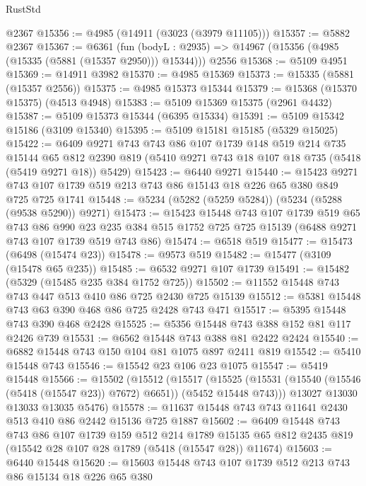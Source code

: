 \begin{lexlean}{RustStd}
\begin{coremodule}
    @2367
@15356 := @4985 (@14911 (@3023 (@3979 @11105)))
@15357 := @5882 @2367
@15367 := @6361
    (fun (bodyL : @2935) => @14967 (@15356 (@4985 (@15335 (@5881 (@15357 @2950))) @15344)))
    @2556
@15368 := @5109 @4951
@15369 := @14911 @3982
@15370 := @4985 @15369
@15373 := @15335 (@5881 (@15357 @2556))
@15375 := @4985 @15373 @15344
@15379 := @15368 (@15370 @15375) (@4513 @4948)
@15383 := @5109 @15369 @15375 (@2961 @4432)
@15387 := @5109 @15373 @15344 (@6395 @15334)
@15391 := @5109 @15342 @15186 (@3109 @15340)
@15395 := @5109 @15181 @15185 (@5329 @15025)
@15422 := @6409
    @9271
    @743
    @743
    @86
    @107
    @1739
    @148
    @519
    @214
    @735
    @15144
    @65
    @812
    @2390
    @819
    (@5410 @9271 @743 @18 @107 @18 @735 (@5418 (@5419 @9271 @18)) @5429)
@15423 := @6440 @9271
@15440 := @15423
    @9271
    @743
    @107
    @1739
    @519
    @213
    @743
    @86
    @15143
    @18
    @226
    @65
    @380
    @849
    @725
    @725
    @1741
@15448 := @5234 (@5282 (@5259 @5284)) (@5234 (@5288 (@9538 @5290)) @9271)
@15473 := @15423
    @15448
    @743
    @107
    @1739
    @519
    @65
    @743
    @86
    @990
    @23
    @235
    @384
    @515
    @1752
    @725
    @725
    @15139
    (@6488 @9271 @743 @107 @1739 @519 @743 @86)
@15474 := @6518 @519
@15477 := @15473 (@6498 (@15474 @23))
@15478 := @9573 @519
@15482 := @15477 (@3109 (@15478 @65 @235))
@15485 := @6532 @9271 @107 @1739
@15491 := @15482 (@5329 (@15485 @235 @384 @1752 @725))
@15502 := @11552 @15448 @743 @743 @447 @513 @410 @86 @725 @2430 @725 @15139
@15512 := @5381 @15448 @743 @63 @390 @468 @86 @725 @2428 @743 @471
@15517 := @5395 @15448 @743 @390 @468 @2428
@15525 := @5356 @15448 @743 @388 @152 @81 @117 @2426 @739
@15531 := @6562 @15448 @743 @388 @81 @2422 @2424
@15540 := @6882 @15448 @743 @150 @104 @81 @1075 @897 @2411 @819
@15542 := @5410 @15448 @743
@15546 := @15542 @23 @106 @23 @1075
@15547 := @5419 @15448
@15566 := @15502
    (@15512
      (@15517
        (@15525 (@15531 (@15540 (@15546 (@5418 (@15547 @23)) @7672) @6651)) (@5452 @15448 @743)))
      @13027
      @13030
      @13033
      @13035
      @5476)
@15578 := @11637 @15448 @743 @743 @11641 @2430 @513 @410 @86 @2442 @15136 @725 @1887
@15602 := @6409
    @15448
    @743
    @743
    @86
    @107
    @1739
    @159
    @512
    @214
    @1789
    @15135
    @65
    @812
    @2435
    @819
    (@15542 @28 @107 @28 @1789 (@5418 (@15547 @28)) @11674)
@15603 := @6440 @15448
@15620 := @15603
    @15448
    @743
    @107
    @1739
    @512
    @213
    @743
    @86
    @15134
    @18
    @226
    @65
    @380

\end{coremodule}
\end{lexlean}
